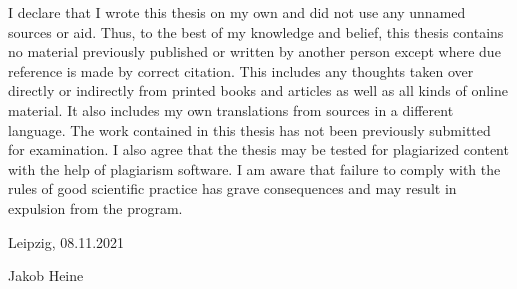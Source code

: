 
I declare that I wrote this thesis on my own and did not use any unnamed sources or aid. Thus, to the best of my knowledge and belief, this thesis contains no material previously published or written by another person except where due reference is made by correct citation. This includes any thoughts taken over directly or indirectly from printed books and articles as well as all kinds of online material. It also includes my own translations from sources in a different language. The work contained in this thesis has not been previously submitted for examination. I also agree that the thesis may be tested for plagiarized content with the help of plagiarism software. I am aware that failure to comply with the rules of good scientific practice has grave consequences and may result in expulsion from the program.

\vskip 1cm

Leipzig, 08.11.2021

\vskip 1.5cm

Jakob Heine